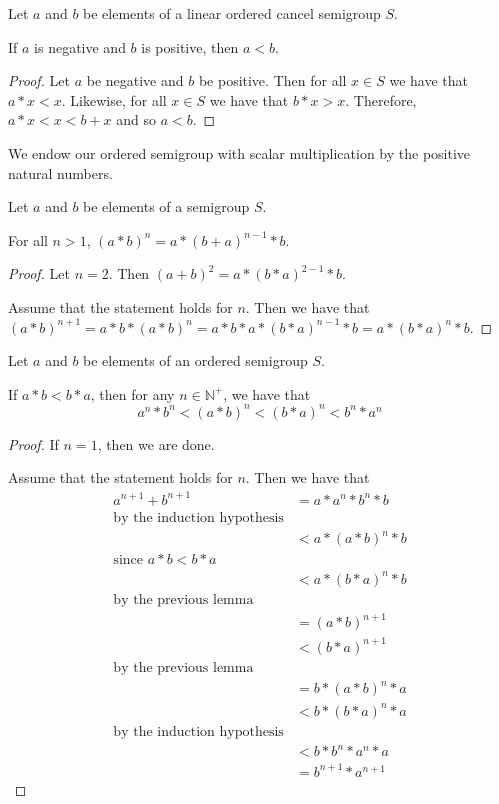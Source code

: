 \begin{theorem}\label{thm:neg_lt_pos}\leanok
{}
Let $a$ and $b$ be elements of a linear ordered cancel semigroup $S$.

If $a$ is negative and $b$ is positive, then $a < b$.
\end{theorem}
\begin{proof}
Let $a$ be negative and $b$ be positive. Then for all $x\in S$ we have that $a * x < x$.
Likewise, for all $x\in S$ we have that $b * x > x$.
Therefore, $a * x < x < b + x$ and so $a < b$.
\end{proof}

We endow our ordered semigroup with scalar multiplication by the positive natural numbers.

\begin{lemma}\label{split_first_and_last}\leanok
Let $a$ and $b$ be elements of a semigroup $S$.

For all $n > 1$, $(a*b)^n = a * (b+a)^{n-1} * b$.
\end{lemma}
\begin{proof}
Let $n=2$. Then $(a+b)^2 = a * (b*a)^{2-1} * b$.

Assume that the statement holds for $n$.
Then we have that $(a*b)^{n+1} = a * b * (a*b)^n = a * b * a * (b*a)^{n-1} * b = a * (b*a)^n * b$.
\end{proof}

\begin{lemma}\label{thm:comm_ineq}\leanok
Let $a$ and $b$ be elements of an ordered semigroup $S$.

If $a * b < b * a$, then for any $n\in \mathbb{N}^+$, we have that
\[a^n * b^n < (a*b)^n < (b*a)^n < b^n * a^n\]
\end{lemma}
\begin{proof}
If $n=1$, then we are done.

Assume that the statement holds for $n$.
Then we have that
\begin{align}
a^{n+1} + b^{n+1} &= a * a^n * b^n * b \\
\text{by the induction hypothesis}\\
&< a * (a * b)^n * b \\
\text{since $a*b < b*a$}\\
&< a * (b * a)^n * b \\
\text{by the previous lemma}\\
&= (a * b)^{n+1} \\
&< (b * a)^{n+1} \\
\text{by the previous lemma}\\
&= b * (a * b)^n * a \\
&< b * (b * a)^n * a \\
\text{by the induction hypothesis}\\
&< b * b^n * a^n * a \\
&= b^{n+1} * a^{n+1}
\end{align}
\end{proof}

